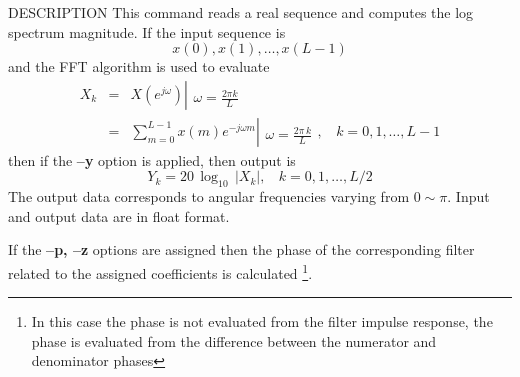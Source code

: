\begin{qsection}{DESCRIPTION}
This command reads a real sequence and computes the log spectrum
magnitude.
If the input sequence is
\begin{displaymath}
  x(0), x(1), \ldots, x(L-1)
\end{displaymath}
and the FFT algorithm is used to evaluate
\begin{eqnarray*}
  X_k &=& X(e^{j\omega}) \left|
	\begin{array}{c}
	\\
        \omega=\frac{2\pi k}{L}
	\end{array}
    \right. \nonumber \\
          &=& \sum_{m=0}^{L-1}x(m)e^{-j\omega m} \left|
	\begin{array}{c}
	\\
        \omega=\frac{2\pi\, k}{L}
	\end{array}
    \right.,~~~~ k=0,1,\ldots,L-1
\end{eqnarray*}
then if the {\bf --y} option is applied, then
output is
\begin{displaymath}
  Y_k=20\,\log_{10}\,|X_k|,~~~~ k=0,1,\ldots,L/2
\end{displaymath}
The output data corresponds to angular frequencies varying from $0\sim \pi$.
Input and output data are in float format.
\par
If the {\bf --p, --z} options are assigned
then the phase of the corresponding filter related to
the assigned coefficients is calculated
\footnote{
In this case the phase is not evaluated from the filter
impulse response, the phase is evaluated from
the difference between the numerator and denominator phases}.
\end{qsection}

